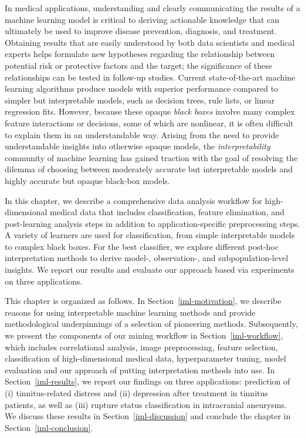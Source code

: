 \documentclass[
  oneside]{book}
\begin{document}
In medical applications, understanding and clearly communicating the results of a machine learning model is critical to deriving actionable knowledge that can ultimately be used to improve disease prevention, diagnosis, and treatment.
Obtaining results that are easily understood by both data scientists and medical experts helps formulate new hypotheses regarding the relationship between potential risk or protective factors and the target; the significance of these relationships can be tested in follow-up studies.
Current state-of-the-art machine learning algorithms produce models with superior performance compared to simpler but interpretable models, such as decision trees, rule lists, or linear regression fits.
However, because these opaque \emph{black boxes} involve many complex feature interactions or decisions, some of which are nonlinear, it is often difficult to explain them in an understandable way.
Arising from the need to provide understandable insights into otherwise opaque models, the \emph{interpretability} community of machine learning has gained traction with the goal of resolving the dilemma of choosing between moderately accurate but interpretable models and highly accurate but opaque black-box models.

In this chapter, we describe a comprehensive data analysis workflow for high-dimensional medical data that includes classification, feature elimination, and post-learning analysis steps in addition to application-specific preprocessing steps.
A variety of learners are used for classification, from simple interpretable models to complex black boxes.
For the best classifier, we explore different post-hoc interpretation methods to derive model-, observation-, and subpopulation-level insights.
We report our results and evaluate our approach based via experiments on three applications.

This chapter is organized as follows.
In Section~\ref{iml-motivation}, we describe reasons for using interpretable machine learning methods and provide methodological underpinnings of a selection of pioneering methods.
Subsequently, we present the components of our mining workflow in Section~\ref{iml-workflow}, which includes correlational analysis, image preprocessing, feature selection, classification of high-dimensional medical data, hyperparameter tuning, model evaluation and our approach of putting interpretation methods into use.
In Section~\ref{iml-results}, we report our findings on three applications: prediction of (i) tinnitus-related distress and (ii) depression after treatment in tinnitus patients, as well as (iii) rupture status classification in intracranial aneurysms.
We discuss these results in Section~\ref{iml-discussion} and conclude the chapter in Section~\ref{iml-conclusion}.
\end{document}
